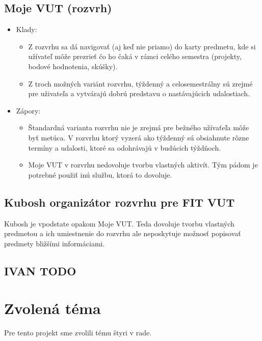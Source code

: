 \documentclass[a4paper, 11pt, onecolumn]{article}
\begin{document}
\subsection*{Moje VUT (rozvrh)}
\begin{itemize}
    \item Klady:
    \begin{itemize}
        \item Z rozvrhu sa dá navigovať (aj keď nie priamo) do karty predmetu, kde si užívateľ môže prezrieť čo ho čaká v rámci celého semestra (projekty, bodové hodnotenia, skúšky). 
        \item Z troch možných variánt rozvrhu, týždenný a celosemestrálny sú zrejmé pre uživateľa a vytvárajú dobrú predstavu o nastávajúcich udalostiach. 
    \end{itemize}
    \item Zápory:
    \begin{itemize}
        \item Štandardná varianta rozvrhu nie je zrejmá pre bežného užívaťeľa môže byť metúca. V rozvrhu ktorý vyzerá ako týždenný sú obsiahnute rôzne termíny a udalosti, ktoré sa odohrávajú v budúcich týždňoch.
        \item Moje VUT v rozvrhu nedovoluje tvorbu vlastných aktivít. Tým pádom je potrebné použiť inú službu, ktorá to dovoluje.
    \end{itemize}
\end{itemize}
\subsection*{Kubosh organizátor rozvrhu pre FIT VUT}
Kubosh je vpodstate opakom Moje VUT. Teda dovoluje tvorbu vlastných predmetou a ich umiestnenie do rozvrhu
ale neposkytuje možnosť popisovať predmety bližšími informáciami.
\subsection{IVAN TODO}
\section{Zvolená téma}
Pre tento projekt sme zvolili tému štyri v rade.
\end{document}

